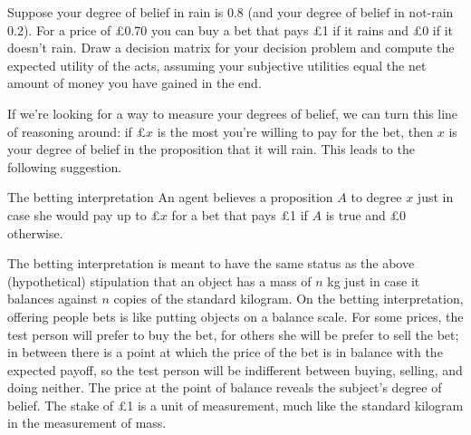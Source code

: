 \begin{exercise1}
  Suppose your degree of belief in rain is $0.8$ (and your degree of
  belief in not-rain 0.2). For a price of £0.70 you can buy a bet that
  pays £1 if it rains and £0 if it doesn't rain. Draw a decision
  matrix for your decision problem and compute the expected utility of
  the acts, assuming your subjective utilities equal the net amount of
  money you have gained in the end.
\end{exercise1}

If we're looking for a way to measure your degrees of belief, we can
turn this line of reasoning around: if £$x$ is the most you're willing
to pay for the bet, then $x$ is your degree of belief in the
proposition that it will rain. This leads to the
following suggestion.

\begin{genericthm}{The betting interpretation}
  An agent believes a proposition $A$ to degree $x$ just in case she
  would pay up to £$x$ for a bet that pays £1 if $A$ is true and £0
  otherwise.
\end{genericthm}

The betting interpretation is meant to have the same status as the
above (hypothetical) stipulation that an object has a mass of $n$ kg
just in case it balances against $n$ copies of the standard kilogram.
On the betting interpretation, offering people bets is like putting
objects on a balance scale. For some prices, the test person will
prefer to buy the bet, for others she will be prefer to sell the bet;
in between there is a point at which the price of the bet is in
balance with the expected payoff, so the test person will be
indifferent between buying, selling, and doing neither. The price at
the point of balance reveals the subject's degree of belief. The stake
of £1 is a unit of measurement, much like the standard kilogram in the
measurement of mass.


